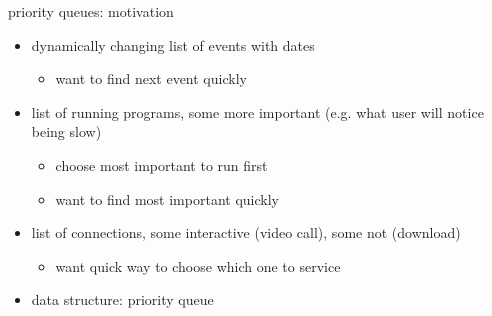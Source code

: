 \begin{frame}{priority queues: motivation}
\begin{itemize}
\item dynamically changing list of events with dates
    \begin{itemize}
    \item want to find next event quickly
    \end{itemize}
\item list of running programs, some more important (e.g. what user will notice being slow)
    \begin{itemize}
    \item choose most important to run first
    \item want to find most important quickly
    \end{itemize}
\item list of connections, some interactive (video call), some not (download)
    \begin{itemize}
    \item want quick way to choose which one to service
    \end{itemize}
\vspace{.5cm}
\item data structure: priority queue
\end{itemize}
\end{frame}
